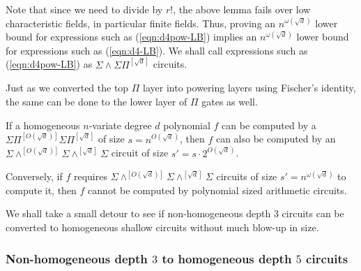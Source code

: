 \documentclass[12pt]{report}
\newcommand{\SPSPfanin}[2]{\Sigma\Pi^{[#1]}\Sigma\Pi^{[#2]}}
\begin{document}
Note that since we need to divide by $r!$, the above lemma fails over low characteristic fields, in particular finite fields. Thus, proving an $n^{\omega(\sqrt{d})}$ lower bound for expressions such as (\ref{eqn:d4pow-LB}) implies an $n^{\omega(\sqrt{d})}$ lower bound for expressions such as (\ref{eqn:d4-LB}). We shall call expressions such as (\ref{eqn:d4pow-LB}) as $\Sigma\!\wedge\!\Sigma\Pi^{[\sqrt{d}]}$ circuits. 

Just as we converted the top $\Pi$ layer into powering layers using Fischer's identity, the same can be done to the lower layer of $\Pi$ gates as well.

\begin{corollary}\label{cor:pow-genckt}
If a homogeneous $n$-variate degree $d$ polynomial $f$ can be computed by a $\SPSPfanin{O(\sqrt{d})}{\sqrt{d}}$ of size $s = n^{O(\sqrt{d})}$, then $f$ can also be computed by an $\Sigma\!\wedge^{[O(\sqrt{d})]}\!\Sigma\!\wedge^{[\sqrt{d}]}\!\Sigma$ circuit of size $s' = s \cdot 2^{O(\sqrt{d})}$. 

Conversely, if $f$ requires $\Sigma\!\wedge^{[O(\sqrt{d})]}\!\Sigma\!\wedge^{[\sqrt{d}]}\!\Sigma$ circuits of size $s' = n^{\omega(\sqrt{d})}$ to compute it, then $f$ cannot be computed by polynomial sized arithmetic circuits. 
\end{corollary}

We shall take a small detour to see if non-homogeneous depth $3$ circuits can be converted to homogeneous shallow circuits without much blow-up in size.

\subsubsection{Non-homogeneous depth $3$ to homogeneous depth $5$ circuits}
\end{document}

